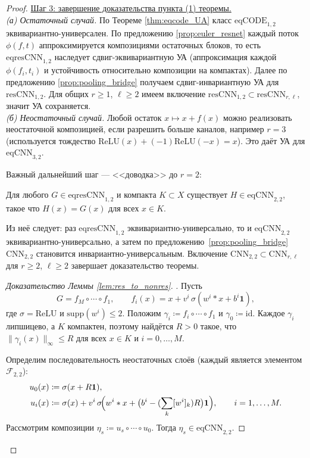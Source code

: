 \documentclass[../NDCNNAI_main.tex]{subfiles}
\begin{document}
\begin{proof}
\underline{Шаг 3: завершение доказательства пункта (1) теоремы.}\\
\emph{(а) Остаточный случай.}
По Теореме \ref{thm:eqcode_UA} класс $\mathrm{eqCODE}_{1,2}$ эквивариантно-универсален.
По предложению \ref{prop:euler_resnet} каждый поток $\phi(f,t)$ аппроксимируется композициями остаточных блоков, то есть
$\mathrm{eqresCNN}_{1,2}$ наследует сдвиг-эквивариантную УА (аппроксимация каждой $\phi(f_i,t_i)$ и устойчивость относительно композиции на компактах).
Далее по предложению \ref{prop:pooling_bridge} получаем сдвиг-инвариантную УА для $\mathrm{resCNN}_{1,2}$.
Для общих $r\ge 1$, $\ell\ge 2$ имеем включение $\mathrm{resCNN}_{1,2}\subset \mathrm{resCNN}_{r,\ell}$, значит УА сохраняется.\\
\emph{(б) Неостаточный случай.}
Любой остаток $x\mapsto x+f(x)$ можно реализовать неостаточной композицией, если разрешить больше каналов, например $r=3$
(используется тождество $\mathrm{ReLU}(x)+(-1)\mathrm{ReLU}(-x)=x$).
Это даёт УА для $\mathrm{eqCNN}_{3,2}$.

Важный дальнейший шаг --- <<доводка>> до $r=2$:

\begin{lemma}[Локальная симуляция остаточных сетей неостаточными при $r=2$.]
\label{lem:res_to_nonres}
Для любого $G\in \mathrm{eqresCNN}_{1,2}$ и компакта $K\subset X$ существует $H\in \mathrm{eqCNN}_{2,2}$, такое что
$H(x)=G(x)$ для всех $x\in K$. 
\end{lemma}
Из неё следует: раз $\mathrm{eqresCNN}_{1,2}$ эквивариантно-универсально, то и $\mathrm{eqCNN}_{2,2}$ эквивариантно-универсально,
а затем по предложению~\ref{prop:pooling_bridge} $\mathrm{CNN}_{2,2}$ становится инвариантно-универсальным.
Включение $\mathrm{CNN}_{2,2}\subset \mathrm{CNN}_{r,\ell}$ для $r\ge 2$, $\ell\ge 2$ завершает доказательство теоремы.

\begin{proof}[Доказательство Леммы \ref{lem:res_to_nonres}].
Пусть
\[
G = f_M\circ\cdots\circ f_1,\qquad f_i(x)=x+ v^i\,\sigma(w^i*x+b^i\mathbf{1}),
\]
где $\sigma=\mathrm{ReLU}$ и $\mathrm{supp}(w^i)\le 2$.
Положим $\gamma_i\coloneq f_i\circ\cdots\circ f_1$ и $\gamma_0\coloneq \mathrm{id}$.
Каждое $\gamma_i$ липшицево, а $K$ компактен, поэтому найдётся $R>0$ такое, что
$\|\gamma_i(x)\|_\infty\le R$ для всех $x\in K$ и $i=0,\dots,M$.

Определим последовательность неостаточных слоёв (каждый является элементом $\mathcal{F}_{2,2}$):
\begin{align}
u_0(x) &\coloneq  \sigma(x+R\mathbf{1}),
\label{eq:u0}\\
u_i(x) &\coloneq  \sigma(x) + v^i\,\sigma\!\Bigl(w^i*x + \bigl(b^i-(\sum_k [w^i]_k)R\bigr)\mathbf{1}\Bigr),\qquad i=1,\dots,M.
\label{eq:ui}
\end{align}
Рассмотрим композиции $\eta_s\coloneq u_s\circ\cdots\circ u_0$.
Тогда $\eta_s\in \mathrm{eqCNN}_{2,2}$.


\end{proof}
\end{proof}
\end{document}
